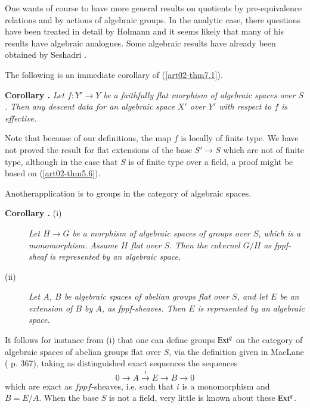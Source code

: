One wants of course to have more general results on quotients by pre-equivalence relations and by actions of algebraic groups. In the analytic case, there questions have been treated in detail by Holmann \cite{art02-key19} and it seems likely that many of his results have algebraic analogues. Some algebraic results have already been obtained by Seshadri \cite{art02-key33}.

The following is an immediate corollary of (\ref{art02-thm7.1}).

\medskip
\noindent
{\bf Corollary .\label{art02-coro7.2}}
{\em Let $f:Y'\to Y$ be a faithfully flat morphism of algebraic spaces over $S$. Then any descent data for an algebraic space $X'$ over $Y'$ with respect to $f$ is effective.}
\smallskip

\noindent
Note that because of our definitions, the map $f$ is locally of finite type. We have not proved the result for flat extensions of the base $S'\to S$ which are not of finite type, although in the case that $S$ is of finite type over a field, a proof might be based on (\ref{art02-thm5.6}).

Another\pageoriginale application is to groups in the category of algebraic spaces.

\medskip
\begin{description}
\item[{\bf Corollary .\label{art02-coro7.3}} {\rm(i)}]
{\em Let $H\to G$ be a morphism of algebraic spaces of groups over $S$, which is a monomorphism. Assume $H$ flat over $S$. Then the cokernel $G/H$ as fppf-sheaf is represented by an algebraic space.}

\item[{\rm(ii)}] {\em Let $A$, $B$ be algebraic spaces of abelian groups flat over $S$, and let $E$ be an extension of $B$ by $A$, as fppf-sheaves. Then $E$ is represented by an algebraic space.}
\end{description}

It follows for instance from (i) that one can define groups $\operatorname{\mathrm{Ext}}^{q}$ on the category of algebraic spaces of abelian groups flat over $S$, via the definition given in MacLane (\cite{art02-key22} p. 367), taking as distinguished exact sequences the sequences
$$
0\rightarrow A\xrightarrow{i} E\rightarrow B\rightarrow 0
$$
which are exact as $fppf$-sheaves, i.e. such that $i$ is a monomorphism and $B=E/A$. When the base $S$ is not a field, very little is known about these $\operatorname{\mathrm{Ext}}^{q}$.

